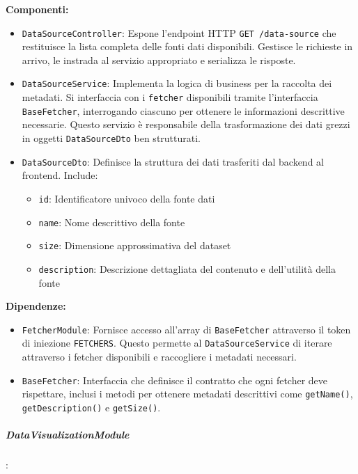 \textbf{Componenti:}
\begin{itemize}
    \item \texttt{DataSourceController}: Espone l'endpoint HTTP \texttt{GET /data-source} che restituisce la lista completa delle fonti dati disponibili. Gestisce le richieste in arrivo, le instrada al servizio appropriato e serializza le risposte.
    
    \item \texttt{DataSourceService}: Implementa la logica di business per la raccolta dei metadati. Si interfaccia con i \texttt{fetcher} disponibili tramite l'interfaccia \texttt{BaseFetcher}, interrogando ciascuno per ottenere le informazioni descrittive necessarie. Questo servizio è responsabile della trasformazione dei dati grezzi in oggetti \texttt{DataSourceDto} ben strutturati.
    
    \item \texttt{DataSourceDto}: Definisce la struttura dei dati trasferiti dal backend al frontend. Include:
    \begin{itemize}
        \item \texttt{id}: Identificatore univoco della fonte dati
        \item \texttt{name}: Nome descrittivo della fonte
        \item \texttt{size}: Dimensione approssimativa del dataset
        \item \texttt{description}: Descrizione dettagliata del contenuto e dell'utilità della fonte
    \end{itemize}
\end{itemize}

\textbf{Dipendenze:}
\begin{itemize}
    \item \texttt{FetcherModule}: Fornisce accesso all'array di \texttt{BaseFetcher} attraverso il token di iniezione \texttt{FETCHERS}. Questo permette al \texttt{DataSourceService} di iterare attraverso i fetcher disponibili e raccogliere i metadati necessari.
    
    \item \texttt{BaseFetcher}: Interfaccia che definisce il contratto che ogni fetcher deve rispettare, inclusi i metodi per ottenere metadati descrittivi come \texttt{getName()}, \texttt{getDescription()} e \texttt{getSize()}.
\end{itemize}

\subparagraph{DataVisualizationModule}:

